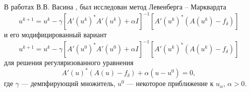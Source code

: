 В работах В.В. Васина \cite{Vasin_2012}, \cite{VasPer_2011} был исследован метод Левенберга -- Марквардта
\begin{equation}\label{LM_Vasin}
u^{k+1}=u^k-\gamma[A'(u^k)^*A'(u^k)+\alpha I]^{-1} [A'(u^k)^*(A(u^k)-f_\delta)]
\end{equation} и его модифицированный вариант
\begin{equation}\label{LM_modif_Vasin}
u^{k+1}=u^k-\gamma[A'(u^0)^*A'(u^0)+\alpha I]^{-1} [A'(u^k)^*(A(u^k)-f_\delta)]
\end{equation} для решения регуляризованного уравнения
$$A'(u)^*(A(u)-f_\delta)+	\alpha (u-u^0)=0,$$
где $\gamma$ --- демпфирующий множитель, $u^0$ --- некоторое приближение к $u_\alpha$, $\alpha>0$. 

